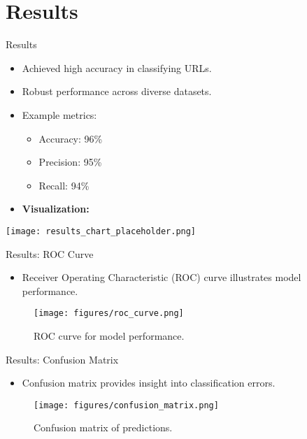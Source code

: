 \documentclass{beamer}
\begin{document}
\section{Results}
\begin{frame}{Results}
  \begin{itemize}
    \item Achieved high accuracy in classifying URLs.
    \item Robust performance across diverse datasets.
    \item Example metrics:
      \begin{itemize}
        \item Accuracy: 96\%
        \item Precision: 95\%
        \item Recall: 94\%
      \end{itemize}
    \item \textbf{Visualization:}
  \end{itemize}
  \begin{center}
    \texttt{[image: results\_chart\_placeholder.png]}
  \end{center}
\end{frame}

\begin{frame}{Results: ROC Curve}
    \begin{itemize}
        \item Receiver Operating Characteristic (ROC) curve illustrates model performance.
    \end{itemize}
    \begin{figure}[h]
        \centering
        \texttt{[image: figures/roc\_curve.png]} %
        \caption{ROC curve for model performance.}
    \end{figure}
\end{frame}

\begin{frame}{Results: Confusion Matrix}
    \begin{itemize}
        \item Confusion matrix provides insight into classification errors.
    \end{itemize}
    \begin{figure}[h]
        \centering
        \texttt{[image: figures/confusion\_matrix.png]} %
        \caption{Confusion matrix of predictions.}
    \end{figure}
\end{frame}
\end{document}
